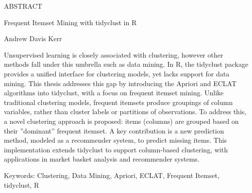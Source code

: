 \begin{center}
{{\MakeUppercase{Abstract}}\par
Frequent Itemset Mining with tidyclust in R\par
Andrew Davis Kerr\par
}
\end{center}

Unsupervised learning is closely associated with clustering, however other methods
fall under this umbrella such as data mining. In R, the tidyclust package provides a 
unified interface for clustering models, yet lacks support for data mining. This 
thesis addresses this gap by introducing the Apriori and ECLAT algorithms into tidyclust, 
with a focus on frequent itemset mining. Unlike traditional clustering models, frequent 
itemsets produce groupings of column variables, rather than cluster labels or partitions 
of observations. To address this, a novel clustering approach is proposed: items (columns) 
are grouped based on their ”dominant” frequent itemset. A key contribution is a new
prediction method, modeled as a recommender system, to predict missing items. This 
implementation extends tidyclust to support column-based clustering, with applications 
in market basket analysis and recommender systems.

\par
\vspace*{\fill}
{Keywords}: Clustering, Data Mining, Apriori, ECLAT, Frequent Itemset, tidyclust, R
\vspace{0.5in}
\newpage